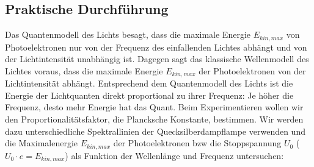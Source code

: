 \documentclass[12px]{scrartcl}
\begin{document}
\subsection{Praktische Durchführung}
Das Quantenmodell des Lichts besagt, dass die maximale Energie $E_{kin,max}$ von Photoelektronen nur von der Frequenz des einfallenden Lichtes abhängt und von der Lichtintensität unabhängig ist.
Dagegen sagt das klassische Wellenmodell des Lichtes voraus, dass die maximale Energie $E_{kin,max}$ der Photoelektronen von der Lichtintensität abhängt.
Entsprechend dem Quantenmodell des Lichts ist die Energie der Lichtquanten direkt proportional zu ihrer Frequenz: Je höher die Frequenz, desto mehr Energie hat das Quant. Beim Experimentieren wollen wir den Proportionalitätsfaktor, die Plancksche Konstante, bestimmen.
Wir werden dazu unterschiedliche Spektrallinien der Quecksilberdampflampe verwenden und die Maximalenergie $E_{kin,max}$ der Photoelektronen bzw die Stoppspannung $U_0$ ($U_0\cdot e = E_{kin,max}$) als Funktion der Wellenlänge und Frequenz untersuchen:
\end{document}
